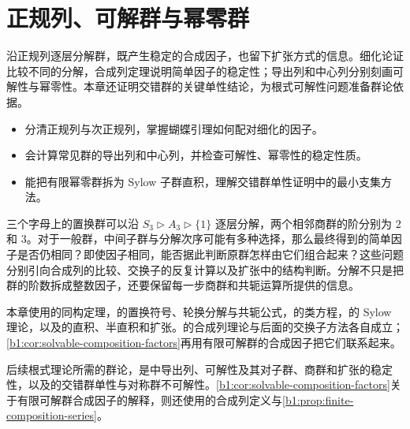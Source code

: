 
\chapter{正规列、可解群与幂零群}
\label{b1:ch:07}

\begin{chapterabstract}
	沿正规列逐层分解群，既产生稳定的合成因子，也留下扩张方式的信息。细化论证比较不同的分解，合成列定理说明简单因子的稳定性；导出列和中心列分别刻画可解性与幂零性。本章还证明交错群的关键单性结论，为根式可解性问题准备群论依据。
\end{chapterabstract}

\begin{learninggoals}
	\begin{itemize}
		\item 分清正规列与次正规列，掌握蝴蝶引理如何配对细化的因子。
		\item 会计算常见群的导出列和中心列，并检查可解性、幂零性的稳定性质。
		\item 能把有限幂零群拆为 Sylow 子群直积，理解交错群单性证明中的最小支集方法。
	\end{itemize}
\end{learninggoals}

三个字母上的置换群可以沿 \(S_3\triangleright A_3\triangleright\{1\}\) 逐层分解，两个相邻商群的阶分别为 \(2\) 和 \(3\)。对于一般群，中间子群与分解次序可能有多种选择，那么最终得到的简单因子是否仍相同？即使因子相同，能否据此判断原群怎样由它们组合起来？这些问题分别引向合成列的比较、交换子的反复计算以及扩张中的结构判断。分解不只是把群的阶数拆成整数因子，还要保留每一步商群和共轭运算所提供的信息。

\ProseParagraphBreak

本章使用的同构定理，的置换符号、轮换分解与共轭公式，的类方程，的 Sylow 理论，以及的直积、半直积和扩张。的合成列理论与后面的交换子方法各自成立；\cref{b1:cor:solvable-composition-factors}再用有限可解群的合成因子把它们联系起来。

\ProseParagraphBreak
后续根式理论所需的群论，是中导出列、可解性及其对子群、商群和扩张的稳定性，以及的交错群单性与对称群不可解性。\cref{b1:cor:solvable-composition-factors}关于有限可解群合成因子的解释，则还使用的合成列定义与\cref{b1:prop:finite-composition-series}。

